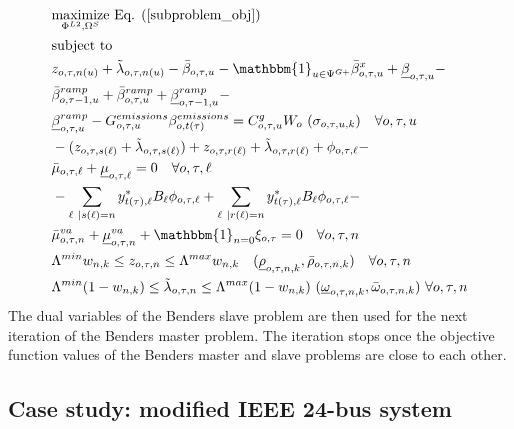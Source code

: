 \documentclass[final]{IEEEtran}
\begin{document}
\begin{align}
&\label{benders_slave_obj}\underset{\Phi^{L2}, \Omega^{S}}{\text{maximize}} \textrm{ Eq. (\ref{subproblem_obj})} \\
&\text{subject to} \nonumber \\
&z_{o, \tau, n(u)} + \tilde{\lambda}_{o, \tau, n(u)} - \bar{\beta}_{o, \tau, u} - \mathbbm{1}_{u \in \Psi^{G+}} \bar{\beta}^x_{o, \tau, u} + \underline{\beta}_{o, \tau, u} - \nonumber \\
&\bar{\beta}_{o, \tau - 1, u}^{ramp} + \bar{\beta}_{o, \tau, u}^{ramp} + \underline{\beta}_{o, \tau - 1, u}^{ramp} - \nonumber \\
&\underline{\beta}_{o, \tau, u}^{ramp} - G_{o, \tau, u}^{emissions} \beta_{o, t(\tau)}^{emissions} = C^g_{o, \tau, u}  W_o \, \, (\sigma_{o, \tau, u, k}) \quad \forall o, \tau, u \\
&-(z_{o, \tau, s(\ell)} + \tilde{\lambda}_{o, \tau, s(\ell)}) + z_{o, \tau, r(\ell)} + \tilde{\lambda}_{o, \tau, r(\ell)} + \phi_{o, \tau, \ell} - \nonumber \\
&\bar{\mu}_{o, \tau, \ell} + \underline{\mu}_{o, \tau, \ell} = 0 \quad \forall o, \tau, \ell \\
&-\sum\limits_{\ell | s(\ell) = n} y_{t(\tau), \ell}^* B_\ell \phi_{o, \tau, \ell} + \sum\limits_{\ell | r(\ell) = n} y_{t(\tau), \ell}^* B_\ell \phi_{o, \tau, \ell} - \nonumber \\
&\bar{\mu}^{va}_{o, \tau, n} + \underline{\mu}^{va}_{o, \tau, n} + \mathbbm{1}_{n = 0} \xi_{o, \tau} = 0 \quad \forall o, \tau, n \\
&\Lambda^{min} w_{n, k} \leq z_{o, \tau, n} \leq \Lambda^{max} w_{n, k} \quad (\underline{\rho}_{o, \tau, n, k}, \bar{\rho}_{o, \tau, n, k}) \quad \forall o,\tau,n \\
&\label{benders_slave_last}\Lambda^{min} (1 - w_{n, k}) \leq \tilde{\lambda}_{o, \tau, n} \leq \Lambda^{max} (1 - w_{n, k}) \, \, (\underline{\omega}_{o, \tau, n, k}, \bar{\omega}_{o, \tau, n, k}) \, \, \forall o,\tau,n
\end{align}
The dual variables of the Benders slave problem are then used for the next iteration of the Benders master problem. The iteration stops once the objective function values of the Benders master and slave problems are close to each other.

\subsection{Case study: modified IEEE 24-bus system}
\end{document}
